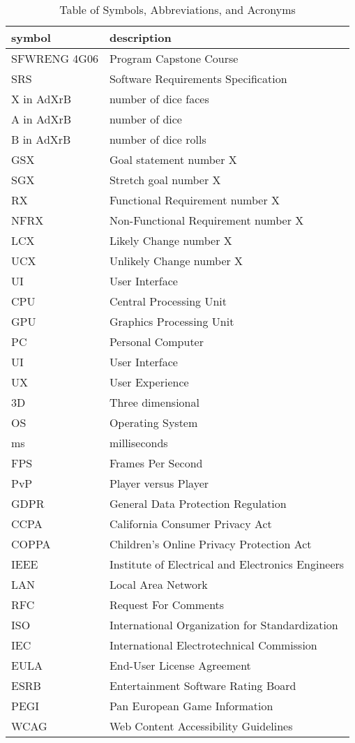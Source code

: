 \begin{table}[H]
\begin{tabular}{l l} 
  \toprule		
  \textbf{symbol} & \textbf{description}\\
  \midrule
  SFWRENG 4G06 & Program Capstone Course\\
  SRS & Software Requirements Specification\\
  X in AdXrB & number of dice faces\\
  A in AdXrB & number of dice\\
  B in AdXrB & number of dice rolls\\
  GSX & Goal statement number X\\
  SGX & Stretch goal number X\\
  RX & Functional Requirement number X\\
  NFRX & Non-Functional Requirement number X\\
  LCX & Likely Change number X\\
  UCX & Unlikely Change number X\\
  UI & User Interface\\
  CPU & Central Processing Unit\\
  GPU & Graphics Processing Unit\\
  PC & Personal Computer\\
  UI & User Interface\\
  UX & User Experience\\
  3D & Three dimensional\\
  OS & Operating System\\
  ms & milliseconds\\
  FPS & Frames Per Second\\
  PvP & Player versus Player\\
  GDPR & General Data Protection Regulation\\
  CCPA & California Consumer Privacy Act\\
  COPPA & Children’s Online Privacy Protection Act\\
  IEEE & Institute of Electrical and Electronics Engineers\\
  LAN & Local Area Network\\
  RFC & Request For Comments\\
  ISO & International Organization for Standardization\\
  IEC & International Electrotechnical Commission\\
  EULA & End-User License Agreement\\
  ESRB & Entertainment Software Rating Board\\
  PEGI & Pan European Game Information\\
  WCAG & Web Content Accessibility Guidelines\\
  

  \bottomrule
  
\end{tabular}\\
\caption{Table of Symbols, Abbreviations, and Acronyms}
\end{table}
